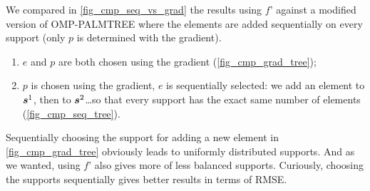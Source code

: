 \FloatBarrier
\noindent
We compared in \cref{fig_cmp_seq_vs_grad} the results using $f’$ against a modified version of OMP-PALMTREE where the elements are added sequentially on every support (only $p$ is determined with the gradient).
\begin{enumerate}[label=(\alph*)]
	\item $e$ and $p$ are both chosen using the gradient (\cref{fig_cmp_grad_tree});
	\item $p$ is chosen using the gradient, $e$ is sequentially selected: we add an element to $\bm{s}^1$, then to $\bm{s}^2$\dots so that every support has the exact same number of elements (\cref{fig_cmp_seq_tree}).
\end{enumerate}

\noindent
Sequentially choosing the support for adding a new element in \cref{fig_cmp_grad_tree} obviously leads to uniformly distributed supports. And as we wanted, using $f’$ also gives more of less balanced supports. Curiously, choosing the supports sequentially gives better results in terms of RMSE.

